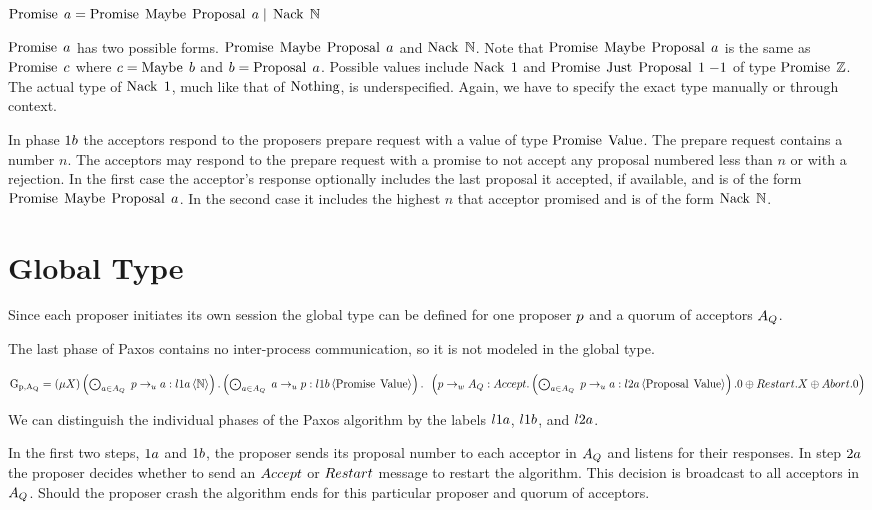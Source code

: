 $\operatorname{Promise}\; a = \operatorname{Promise}\; \operatorname{Maybe}\; \operatorname{Proposal}\; a \; | \; \operatorname{Nack}\; \mathbb{N}$

$\operatorname{Promise}\; a$ has two possible forms.
$\operatorname{Promise}\; \operatorname{Maybe}\; \operatorname{Proposal}\; a$ and $\operatorname{Nack}\; \mathbb{N}$.
Note that $\operatorname{Promise}\; \operatorname{Maybe}\; \operatorname{Proposal}\; a$ is the same as $\operatorname{Promise}\; c$ where $c = \operatorname{Maybe}\; b$ and $b = \operatorname{Proposal}\; a$.
Possible values include $\operatorname{Nack}\; 1$ and $\operatorname{Promise}\; \operatorname{Just}\; \operatorname{Proposal}\; 1\; {-1}$ of type $\operatorname{Promise}\; \mathbb{Z}$.
The actual type of $\operatorname{Nack}\; 1$, much like that of $\operatorname{Nothing}$, is underspecified.
Again, we have to specify the exact type manually or through context.

In phase $1b$ the acceptors respond to the proposers prepare request with a value of type $\operatorname{Promise}\; \operatorname{Value}$.
The prepare request contains a number $n$.
The acceptors may respond to the prepare request with a promise to not accept any proposal numbered less than $n$ or with a rejection.
In the first case the acceptor's response optionally includes the last proposal it accepted, if available, and is of the form $\operatorname{Promise}\; \operatorname{Maybe}\; \operatorname{Proposal}\; a$.
In the second case it includes the highest $n$ that acceptor promised and is of the form $\operatorname{Nack}\; \mathbb{N}$.

\section{Global Type}
Since each proposer initiates its own session the global type can be defined for one proposer $p$ and a quorum of acceptors $A_Q$.

The last phase of Paxos contains no inter-process communication, so it is not modeled in the global type.

$\operatorname{G_{p, A_Q}} = \left(\mu X\right)
\left(\bigodot_{a \in A_Q}\;p \to_u a : l1a \left\langle \mathbb{N} \right\rangle\right) .
\left(\bigodot_{a \in A_Q}\;a \to_u p : l1b \left\langle \operatorname{Promise}\; \operatorname{Value} \right\rangle\right) .\\
\hspace*{0.5em * 1}\left(p \to_w A_Q : 
\mathnormal{Accept}.\left(\bigodot_{a \in A_Q}\;p \to_u a : l2a \left\langle \operatorname{Proposal}\; \operatorname{Value} \right\rangle\right).0 \oplus
\mathnormal{Restart}.X \oplus
\mathnormal{Abort}.0\right)$

We can distinguish the individual phases of the Paxos algorithm by the labels $l1a$, $l1b$, and $l2a$.

In the first two steps, $1a$ and $1b$, the proposer sends its proposal number to each acceptor in $A_Q$ and listens for their responses.
In step $2a$ the proposer decides whether to send an $\mathnormal{Accept}$ or $\mathnormal{Restart}$ message to restart the algorithm.
This decision is broadcast to all acceptors in $A_Q$.
Should the proposer crash the algorithm ends for this particular proposer and quorum of acceptors.

